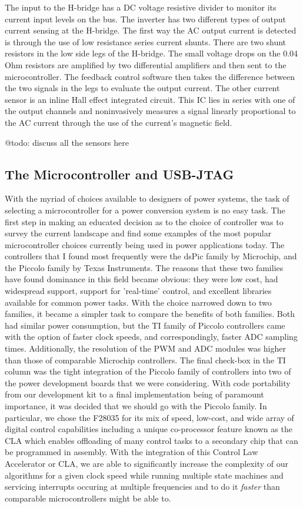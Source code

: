 The input to the H-bridge has a DC voltage resistive divider to monitor its current input levels on the bus. The inverter has two different types of output current sensing at the H-bridge. The first way the AC output current is detected is through the use of low resistance series current shunts. There are two shunt resistors in the low side legs of the H-bridge. The small voltage drops on the 0.04 Ohm resistors are amplified by two differential amplifiers and then sent to the microcontroller. The feedback control software then takes the difference between the two signals in the legs to evaluate the output current. The other current sensor is an inline Hall effect integrated circuit. This IC lies in series with one of the output channels and noninvasively measures a signal linearly proportional to the AC current through the use of the current’s magnetic field.

@todo: discuss all the sensors here

\subsection{The Microcontroller and USB-JTAG}
With the myriad of choices available to designers of power systems, the task of selecting a microcontroller for a power conversion system is no easy task. The first step in making an educated decision as to the choice of controller was to survey the current landscape and find some examples of the most popular microcontroller choices currently being used in power applications today. The controllers that I found most frequently were the dsPic family by Microchip, and the Piccolo family by Texas Instruments. The reasons that these two families have found dominance in this field became obvious: they were low cost, had widespread support, support for 'real-time' control, and excellent libraries available for common power tasks. With the choice narrowed down to two families, it became a simpler task to compare the benefits of both families. Both had similar power consumption, but the TI family of Piccolo controllers came with the option of faster clock speeds, and correspondingly, faster ADC sampling times. Additionally, the resolution of the PWM and ADC modules was higher than those of comparable Microchip controllers. The final check-box in the TI column was the tight integration of the Piccolo family of controllers into two of the power development boards that we were considering. With code portability from our development kit to a final implementation being of paramount importance, it was decided that we should go with the Piccolo family. In particular, we chose the F28035 for its mix of speed, low-cost, and wide array of digital control capabilities including a unique co-processor feature known as the CLA which enables offloading of many control tasks to a secondary chip that can be programmed in assembly. With the integration of this Control Law Accelerator or CLA, we are able to significantly increase the complexity of our algorithms for a given clock speed while running multiple state machines and servicing interrupts occuring at multiple frequencies and to do it \emph{faster} than comparable microcontrollers might be able to.


